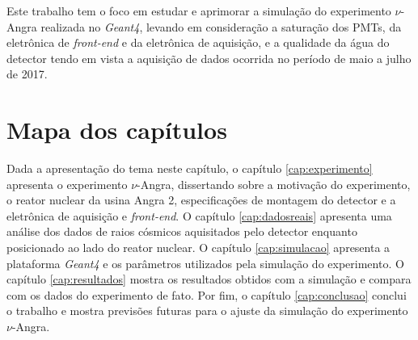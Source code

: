 Este trabalho tem o foco em estudar e aprimorar a simulação do experimento $\nu$-Angra realizada no \emph{Geant4}, levando em consideração a saturação dos \ac{PMTs}, da eletrônica de \emph{front-end} e da eletrônica de aquisição, e a qualidade da água do detector tendo em vista a aquisição de dados ocorrida no período de maio a julho de 2017.

\section{Mapa dos capítulos}

Dada a apresentação do tema neste capítulo, o capítulo \ref{cap:experimento} apresenta o experimento $\nu$-Angra, dissertando sobre a motivação do experimento, o reator nuclear da usina Angra 2, especificações de montagem do detector e a eletrônica de aquisição e \emph{front-end}. O capítulo \ref{cap:dadosreais} apresenta uma análise dos dados de raios cósmicos aquisitados pelo detector enquanto posicionado ao lado do reator nuclear. O capítulo \ref{cap:simulacao} apresenta a plataforma \emph{Geant4} e os parâmetros utilizados pela simulação do experimento. O capítulo \ref{cap:resultados} mostra os resultados obtidos com a simulação e compara com os dados do experimento de fato. Por fim, o capítulo \ref{cap:conclusao} conclui o trabalho e mostra previsões futuras para o ajuste da simulação do experimento $\nu$-Angra.
